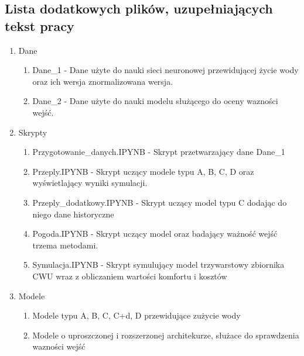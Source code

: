 \documentclass[a4paper,twoside,12pt]{book}
\begin{document}
\begin{appendices}
  \chapter{Lista dodatkowych plików, uzupełniających tekst pracy}

  \begin{enumerate}
    \item Dane
          \begin{enumerate}
            \item Dane\_1 - Dane użyte do nauki sieci neuronowej przewidującej życie wody oraz ich wersja znormalizowana wersja.
            \item Dane\_2 - Dane użyte do nauki modelu służącego do oceny wazności wejść.
          \end{enumerate}
    \item Skrypty
          \begin{enumerate}
            \item Przygotowanie\_danych.IPYNB - Skrypt przetwarzający dane Dane\_1
            \item Przeply.IPYNB - Skrypt uczący modele typu A, B, C, D oraz wyświetlający wyniki symulacji.
            \item Przeply\_dodatkowy.IPYNB - Skrypt uczący model typu C dodając do niego dane historyczne
            \item Pogoda.IPYNB - Skrypt uczący model oraz badający ważność wejść trzema metodami.
            \item Symulacja.IPYNB - Skrypt symulujący model trzywarstowy zbiornika CWU wraz z obliczaniem wartości komfortu i kosztów
          \end{enumerate}
    \item Modele
          \begin{enumerate}
            \item Modele typu A, B, C, C+d, D przewidujące zużycie wody
            \item Modele o uproszczonej i rozszerzonej architekurze, służace do sprawdzenia wazności wejść
          \end{enumerate}
  \end{enumerate}



  \listoffigures
  \listoftables

\end{appendices}
\end{document}
